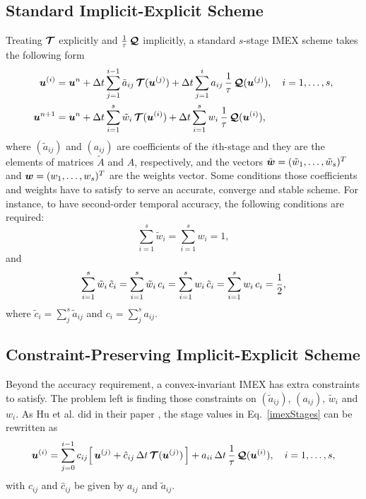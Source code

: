 \subsection{Standard Implicit-Explicit Scheme}
Treating $\boldsymbol{\mathcal{T}}$ explicitly and $\frac{1}{\tau}\,\boldsymbol{\mathcal{Q}}$ implicitly, a standard $s$-stage IMEX scheme takes the following form 
\begin{align}
  \boldsymbol{u}^{(i)}
  &=\boldsymbol{u}^{n}
  +\Delta t\sum_{j=1}^{i-1}\tilde{a}_{ij}\,\boldsymbol{\mathcal{T}}(\boldsymbol{u}^{(j)})
  +\Delta t\sum_{j=1}^{i}a_{ij}\,\frac{1}{\tau}\,\boldsymbol{\mathcal{Q}}(\boldsymbol{u}^{(j)}),
  \quad i=1,\ldots,s, \label{imexStages} \\
  \boldsymbol{u}^{n+1}
  &=\boldsymbol{u}^{n}
  +\Delta t\sum_{i=1}^{s}\tilde{w}_{i}\,\boldsymbol{\mathcal{T}}(\boldsymbol{u}^{(i)})
  +\Delta t\sum_{i=1}^{s}w_{i}\,\frac{1}{\tau}\,\boldsymbol{\mathcal{Q}}(\boldsymbol{u}^{(i)}), \label{imexIntermediate} 
\end{align}
where  $(\tilde{a}_{ij})$ and $(a_{ij})$ are coefficients of the $i$th-stage and they are the elements of matrices $\tilde{A}$ and $A$, respectively, and the vectors $\tilde{\boldsymbol{w}}=(\tilde{w}_{1},\ldots,\tilde{w}_{s})^{T}$ and $\boldsymbol{w}=(w_{1},\ldots,w_{s})^{T}$ are the weights vector.
Some conditions those coefficients and weights have to satisfy to serve an accurate, converge and stable scheme.
For instance, to have second-order temporal accuracy, the following conditions are required:
\begin{equation}
  \sum_{i=1}^{s}\tilde{w}_{i}=\sum_{i=1}^{s}w_{i}=1,
  \label{orderConditions1}
\end{equation}
and
\begin{equation}
  \sum_{i=1}^{s}\tilde{w}_{i}\,\tilde{c}_{i}
  =\sum_{i=1}^{s}\tilde{w}_{i}\,c_{i}
  =\sum_{i=1}^{s}w_{i}\,\tilde{c}_{i}
  =\sum_{i=1}^{s}w_{i}\,c_{i}=\frac{1}{2}, 
  \label{orderConditions2}
\end{equation}
where $\tilde{c}_{i} = \sum_{j}^{s}\tilde{a}_{ij}$ and $c_{i}=\sum_{j}^{s}a_{ij}$.

\subsection{Constraint-Preserving Implicit-Explicit Scheme}
Beyond the accuracy requirement, a convex-invariant IMEX has extra constraints to satisfy.
The problem left is finding those constraints on $(\tilde{a}_{ij})$, $(a_{ij})$, $\tilde{w}_{i}$ and $w_{i}$.
As Hu et al. did in their paper \cite{hu_etal_2018}, the stage values in Eq.~\eqref{imexStages} can be rewritten as
\begin{equation}
  \boldsymbol{u}^{(i)}
  =\sum_{j=0}^{i-1}c_{ij}\Big[\,\boldsymbol{u}^{(j)}+\hat{c}_{ij}\,\Delta t\,\boldsymbol{\mathcal{T}}(\boldsymbol{u}^{(j)})\,\Big]
  +a_{ii}\,\Delta t\,\frac{1}{\tau}\,\boldsymbol{\mathcal{Q}}(\boldsymbol{u}^{(i)}),\quad i=1,\ldots,s,
  \label{eq:imexStagesRewrite}
\end{equation}
with $c_{ij}$ and $\hat{c}_{ij}$ be given by $a_{ij}$ and $\tilde{a}_{ij}$.

